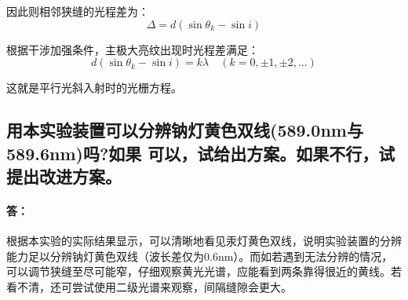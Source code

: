 \documentclass[]{../../templates/Report}%
\begin{document}
\begin{fullreportonly}
因此则相邻狭缝的光程差为：
\[\Delta = d(\sin \theta_k - \sin i)
\]

根据干涉加强条件，主极大亮纹出现时光程差满足：
\[d(\sin \theta_k - \sin i) = k \lambda \quad (k = 0, \pm 1, \pm 2, \dots)
\]

这就是平行光斜入射时的光栅方程。
\subsection{用本实验装置可以分辨钠灯黄色双线(589.0nm与 589.6nm)吗?如果
可以，试给出方案。如果不行，试提出改进方案。}

\paragraph{答：}根据本实验的实际结果显示，可以清晰地看见汞灯黄色双线，说明实验装置的分辨能力足以分辨钠灯黄色双线（波长差仅为0.6nm）。而如若遇到无法分辨的情况，可以调节狭缝至尽可能窄，仔细观察黄光光谱，应能看到两条靠得很近的黄线。若看不清，还可尝试使用二级光谱来观察，间隔缝隙会更大。

\end{fullreportonly}
\insertnotes
\end{document}
